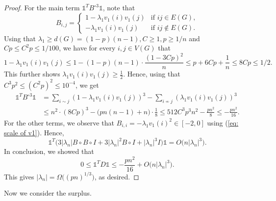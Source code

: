 \documentclass[11pt]{article}
\theoremstyle{plain}
\theoremstyle{definition}
\begin{document}
\begin{proof}
    For the main term $\mathds{1}^T B^{\circ 3} \mathds{1}$, note that $$
    B_{i,j}=\begin{cases}
        1-\lambda_1v_1(i)v_1(j) &\mbox{if }ij\in E(G),\\
        -\lambda_1v_1(i)v_1(j) &\mbox{if }ij\notin E(G).
    \end{cases}$$
    Using that $\lambda_1 \ge d(G)= (1-p)(n-1), C \ge 1,p \ge 1/n$ and $Cp \le C^2p \le 1/100$, we have for every $i,j\in V(G)$ that  $$
        1-\lambda_1v_1(i)v_1(j)
        \le 1 - (1-p)(n-1) \cdot \frac{(1-3Cp)^2}{n}
        \le p + 6Cp + \frac{1}{n}
        \le 8Cp
        \le 1/2.
    $$
    This further shows $\lambda_1v_1(i)v_1(j) \ge \frac{1}{2}$.
    Hence, using that $C^3p^2\le (C^2p)^2 \le 10^{-4}$, we get
    \begin{equation}    \nonumber
      \begin{aligned}
        \mathds{1}^T B^{\circ 3}\mathds{1}
        &= \sum_{i \sim j} (1-\lambda_1v_1(i)v_1(j))^3 - \sum_{i\not\sim j}(\lambda_1v_1(i)v_1(j))^3 \\
        &\le n^2\cdot (8Cp)^3 - \big(pn(n-1)+n\big)\cdot\frac{1}{8}
        \le 512C^3p^3n^2 - \frac{pn^2}{8}
        \le -\frac{pn^2}{16}.
      \end{aligned}
    \end{equation}
    For the other terms, we observe that $B_{i,i}=-\lambda_1v_1(i)^2 \in [-2,0]$ using (\ref{eq: scale of v1}).
    Hence, 
    \begin{equation} \nonumber
        \mathds{1}^T \big(3|\lambda_n|B\circ B\circ I+3|\lambda_n|^2B\circ I+|\lambda_n|^3I \big) \mathds{1}  = O\big(n|\lambda_n|^3\big).        
    \end{equation}
    In conclusion, we showed that $$
        0 \le \mathds{1}^T D \mathds{1}
        \le -\frac{pn^2}{16} + O\big(n|\lambda_n|^3\big).
    $$
    This gives $|\lambda_n| = \Omega\big((pn)^{1/3}\big)$, as desired.
\end{proof}

Now we consider the surplus.
\end{document}
